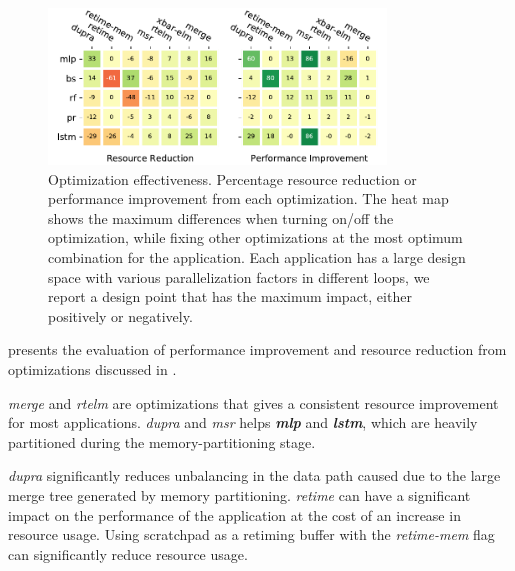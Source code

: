 \begin{figure}
\centering
\includegraphics[width=0.8\textwidth]{figs/heat.pdf}
\caption[Optimization effectiveness]{
  Optimization effectiveness. Percentage resource reduction or performance improvement from each
  optimization. The heat map shows the maximum differences when turning on/off the optimization, 
  while fixing other optimizations at the most optimum combination for the application.
  Each application has a large design space with various parallelization factors in different loops, 
  we report a design point that has the maximum impact, either positively or negatively.
}
\label{fig:heat}
\end{figure}

 presents the evaluation of performance improvement and resource reduction from
optimizations discussed in .

\emph{merge} and \emph{rtelm} are optimizations that gives a consistent resource improvement for most applications.
\emph{dupra} and \emph{msr} helps \emph{\bf mlp} and \emph{\bf lstm}, which are heavily partitioned during the memory-partitioning stage.

\emph{dupra} significantly reduces unbalancing in the data path caused due to the large merge tree generated by memory partitioning.
\emph{retime} can have a significant impact on the performance of the application at the cost of an increase in resource usage.
Using scratchpad as a retiming buffer with the \emph{retime-mem} flag can significantly reduce resource usage.

